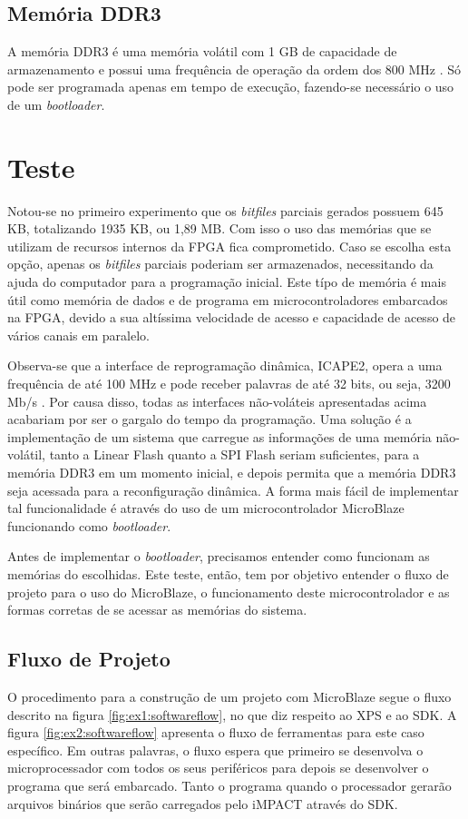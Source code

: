 \documentclass[11pt,a4paper,oneside]{book}
\begin{document}
\subsection{Memória DDR3}
A memória DDR3 é uma memória volátil com 1 GB de capacidade de armazenamento e possui uma frequência de operação da ordem dos 800 MHz \cite{MT8JTF12864HZ}.
Só pode ser programada apenas em tempo de execução, fazendo-se necessário o uso de um \textit{bootloader}.

\section{Teste}
Notou-se no primeiro experimento que os \textit{bitfiles} parciais gerados possuem 645 KB, totalizando 1935 KB, ou 1,89 MB.
Com isso o uso das memórias que se utilizam de recursos internos da FPGA fica comprometido.
Caso se escolha esta opção, apenas os \textit{bitfiles} parciais poderiam ser armazenados, necessitando da ajuda do computador para a programação inicial.
Este típo de memória é mais útil como memória de dados e de programa em microcontroladores embarcados na FPGA, devido a sua altíssima velocidade de acesso e capacidade de acesso de vários canais em paralelo.

Observa-se que a interface de reprogramação dinâmica, ICAPE2, opera a uma frequência de até 100 MHz e pode receber palavras de até 32 bits, ou seja, 3200 Mb/s \cite{ug702}.
Por causa disso, todas as interfaces não-voláteis apresentadas acima acabariam por ser o gargalo do tempo da programação.
Uma solução é a implementação de um sistema que carregue as informações de uma memória não-volátil, tanto a Linear Flash quanto a SPI Flash seriam suficientes, para a memória DDR3 em um momento inicial, e depois permita que a memória DDR3 seja acessada para a reconfiguração dinâmica.
A forma mais fácil de implementar tal funcionalidade é através do uso de um microcontrolador MicroBlaze funcionando como \textit{bootloader}.

Antes de implementar o \textit{bootloader}, precisamos entender como funcionam as memórias do escolhidas.
Este teste, então, tem por objetivo entender o fluxo de projeto para o uso do MicroBlaze, o funcionamento deste microcontrolador e as formas corretas de se acessar as memórias do sistema.

\subsection{Fluxo de Projeto}
O procedimento para a construção de um projeto com MicroBlaze segue o fluxo descrito na figura \ref{fig:ex1:softwareflow}, no que diz respeito ao XPS e ao SDK.
A figura \ref{fig:ex2:softwareflow} apresenta o fluxo de ferramentas para este caso específico.
Em outras palavras, o fluxo espera que primeiro se desenvolva o microprocessador com todos os seus periféricos para depois se desenvolver o programa que será embarcado.
Tanto o programa quando o processador gerarão arquivos binários que serão carregados pelo iMPACT através do SDK.
\end{document}
